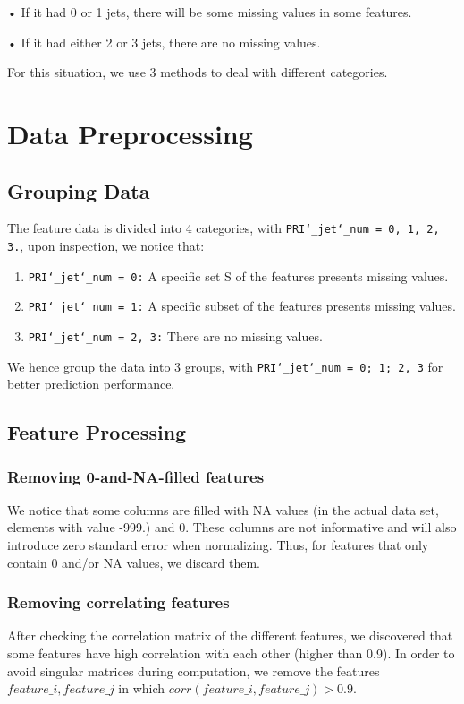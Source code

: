 \documentclass[10pt,conference,compsocconf]{IEEEtran}
\begin{document}
• If it had 0 or 1 jets, there will be some missing values in some features.

• If it had either 2 or 3 jets, there are no missing values.

For this situation, we use 3 methods to deal with different categories. 

\section{Data Preprocessing}
\subsection{Grouping Data}
The feature data is divided into 4 categories, with \texttt{PRI\char`_jet\char`_num = 0, 1, 2, 3.}, upon inspection, we notice that:
\begin{enumerate}
    \item \texttt{PRI\char`_jet\char`_num = 0:} A specific set S of the features presents missing values.
    \item \texttt{PRI\char`_jet\char`_num = 1:} A specific subset of the features presents missing values.
    \item \texttt{PRI\char`_jet\char`_num = 2, 3:} There are no missing values.
\end{enumerate}
\newline
\quad We hence group the data into 3 groups, with \texttt{PRI\char`_jet\char`_num = 0; 1; 2, 3}
for better prediction performance.


\subsection{Feature Processing}
\subsubsection{Removing 0-and-NA-filled features}
We notice that some columns are filled with NA values (in the actual data set, elements with value -999.) and 0. These columns are not informative and will also introduce zero standard error when normalizing. Thus, for features that only contain 0 and/or NA values, we discard them.

\subsubsection{Removing correlating features}
After checking the correlation matrix of the different features, we discovered that some features have high correlation with each other (higher than 0.9). 
In order to avoid singular matrices during computation, we remove the features $feature\_i, feature\_j$ in which $corr(feature\_i, feature\_j) > 0.9$.
\end{document}
